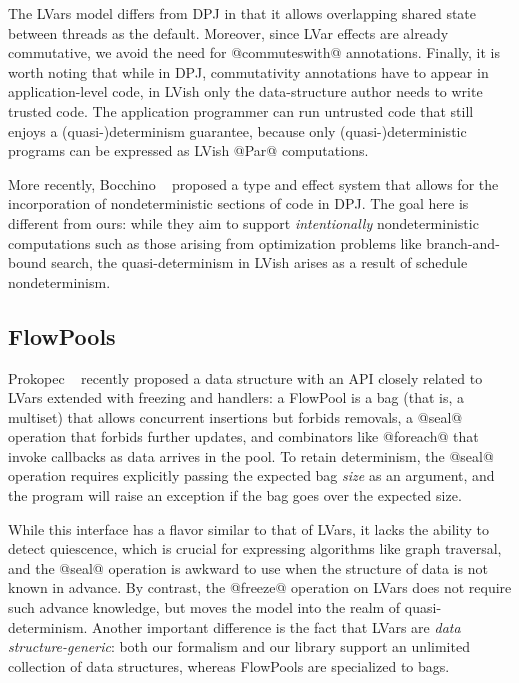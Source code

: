 \documentclass{article}
\begin{document}
The LVars model differs from DPJ in that it allows overlapping shared
state between threads as the default.  Moreover, since LVar effects
are already commutative, we avoid the need for @commuteswith@
annotations.  Finally, it is worth noting that while in DPJ,
commutativity annotations have to appear in application-level code, in
LVish only the data-structure author needs to write trusted code. The
application programmer can run untrusted code that still enjoys a
(quasi-)determinism guarantee, because only (quasi-)deterministic
programs can be expressed as LVish @Par@ computations.

More recently, Bocchino \etal~\cite{dpj-popl} proposed a type and
effect system that allows for the incorporation of nondeterministic
sections of code in DPJ.  The goal here is different from ours: while
they aim to support \emph{intentionally} nondeterministic computations
such as those arising from optimization problems like branch-and-bound
search, the quasi-determinism in LVish arises as a result of schedule
nondeterminism.

\subsection{FlowPools}

Prokopec \etal~\cite{flowpools} recently proposed a data structure
with an API closely related to LVars extended with freezing and
handlers: a FlowPool is a bag (that is, a multiset) that allows
concurrent insertions but forbids removals, a @seal@ operation that
forbids further updates, and combinators like @foreach@ that invoke
callbacks as data arrives in the pool.  To retain determinism, the
@seal@ operation requires explicitly passing the expected bag
\emph{size} as an argument, and the program will raise an exception if
the bag goes over the expected size.

While this interface has a flavor similar to that of LVars, it lacks
the ability to detect quiescence, which is crucial for expressing
algorithms like graph traversal, and the @seal@ operation is awkward
to use when the structure of data is not known in advance.  By
contrast, the @freeze@ operation on LVars does not require such
advance knowledge, but moves the model into the realm of
quasi-determinism.  Another important difference is the fact that
LVars are \emph{data structure-generic}: both our formalism and our
library support an unlimited collection of data structures, whereas
FlowPools are specialized to bags.
\end{document}
